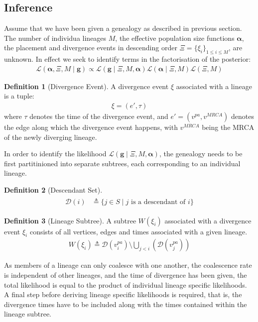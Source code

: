 \documentclass{report}
\theoremstyle{definition}
\newtheorem{definition}{Definition}[section]
\begin{document}
\subsection{Inference}
Assume that we have been given a genealogy as described in previous section. The number of individua lineages $M$, the effective population size functions $\mathbf{\alpha}$, the placement and divergence events in descending order $\Xi =\{\xi_i\}_{1\leq i\leq M}$, are unknown. In effect we seek to identify terms in the factorisation of the posterior:
\begin{gather}
\mathcal{L}(\mathbf{\alpha}, \Xi, M\mid\mathbf{g}) \propto 
\mathcal{L}(\mathbf{g}\mid \Xi, M, \mathbf{\alpha})\mathcal{L}(\mathbf{\alpha}\mid\Xi,M)\mathcal{L}(\Xi,M)
\end{gather}

\begin{definition}[Divergence Event] A divergence event $\xi$ associated with a lineage is a tuple:
\begin{gather}
\xi=\left(e', \tau\right)
\end{gather}
where $\tau$ denotes the time of the divergence event, and $e' = (v^{pa}, v^{MRCA})$ denotes the edge along which the divergence event happens, with $v^{MRCA}$ being the MRCA of the newly diverging lineage.
\end{definition}
In order to identify the likelihood $\mathcal{L}(\mathbf{g}\mid \Xi, M, \mathbf{\alpha})$, the genealogy needs to be first partitinioned into separate subtrees, each corresponding to an individual lineage.

\begin{definition}[Descendant Set]
\begin{gather}
\begin{aligned}
\mathcal{D}(i) &\triangleq \{j\in S\mid j \text{ is a descendant of } i\}
\end{aligned}
\end{gather} 
\end{definition}

\begin{definition}[Lineage Subtree]
A subtree $W(\xi_i)$ associated with a divergence event $\xi_i$ consists of all vertices, edges and times associated with a given lineage.
\begin{gather}
W(\xi_i) \triangleq \mathcal{D}(v^{pa}_i) \setminus \bigcup_{j<i}(\mathcal{D}(v^{pa}_j))
\end{gather} 
\end{definition}
As members of a lineage can only coalesce with one another, the coalescence rate is independent of other lineages, and the time of divergence has been given, the total likelihood is equal to the product of individual lineage specific likelihoods.\\
A final step before deriving lineage specific likelihoods is required, that is, the divergence times have to be included along with the times contained within the lineage subtree.\\
\end{document}
